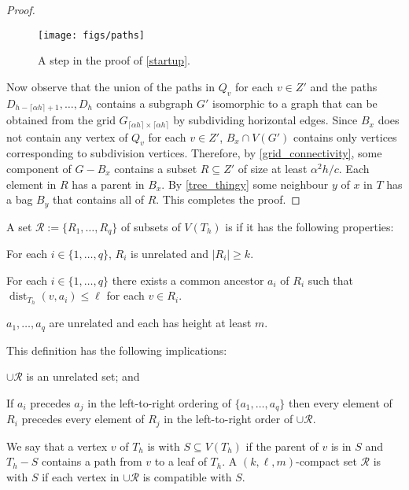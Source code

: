 \documentclass{patmorin}
\DeclareMathOperator{\dist}{dist}
\renewcommand{\le}{\leqslant}
\renewcommand{\ge}{\geqslant}
\begin{document}
\begin{proof}
  \begin{figure}
    \begin{center}
      \texttt{[image: figs/paths]}
    \end{center}
    \caption{A step in the proof of \cref{startup}.}
    \label{paths}
  \end{figure}

  Now observe that the union of the paths in  $Q_{v}$ for each $v\in Z'$ and the paths $D_{h-\lceil\alpha h\rceil+1},\ldots,D_{h}$ contains a subgraph $G'$ isomorphic to a graph that can be obtained from the grid $G_{\lceil \alpha h\rceil\times\lceil \alpha h\rceil}$ by subdividing horizontal edges.  Since $B_x$ does not contain any vertex of $Q_{v}$ for each $v\in Z'$,  $B_x\cap V(G')$ contains only vertices corresponding to subdivision vertices.  Therefore, by \cref{grid_connectivity}, some component of $G-B_x$ contains a subset $R\subseteq Z'$ of size at least $\alpha^2 h/c$.  Each element in $R$ has a parent in $B_x$.  By \cref{tree_thingy} some neighbour $y$ of $x$ in $T$ has a bag $B_y$ that contains all of $R$.  This completes the proof.
\end{proof}



A set $\mathcal{R}:=\{R_1,\ldots,R_q\}$ of subsets of $V(T_h)$ is  if it has the following properties:

\begin{compactenum}
  \item For each $i\in\{1,\ldots,q\}$, $R_i$ is unrelated and $|R_i|\ge k$.
  \item For each $i\in\{1,\ldots,q\}$ there exists a common ancestor $a_i$ of $R_i$ such that $\dist_{T_h}(v,a_i)\le\ell$ for each $v\in R_i$.
  \item $a_1,\ldots,a_q$ are unrelated and each has height at least $m$.
\end{compactenum}

This definition has the following implications:
\begin{inparaenum}[(i)]
  \item $\cup \mathcal{R}$ is an unrelated set; and
  \item If $a_i$ precedes $a_j$ in the left-to-right ordering of $\{a_1,\ldots,a_q\}$ then every element of $R_i$ precedes every element of $R_j$ in the left-to-right order of $\cup\mathcal{R}$.
\end{inparaenum}
We say that a vertex $v$ of $T_h$ is  with $S\subseteq V(T_h)$ if the parent of $v$ is in $S$ and $T_h-S$ contains a path from $v$ to a leaf of $T_h$.  A $(k,\ell,m)$-compact set $\mathcal{R}$ is  with $S$ if each vertex in $\cup\mathcal{R}$ is compatible with $S$.
\end{document}

